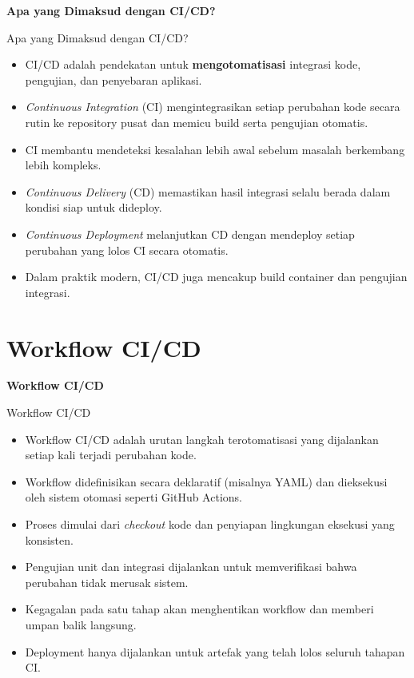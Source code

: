 \documentclass[aspectratio=169, table]{beamer}
\begin{document}
	\begin{frame}{\hfill}
		\centering
		\Huge{\textbf{Apa yang Dimaksud dengan CI/CD?}}
	\end{frame}

\begin{frame}{Apa yang Dimaksud dengan CI/CD?}
	\vspace{6pt}
	\begin{itemize}\small
		\item CI/CD adalah pendekatan untuk \textbf{mengotomatisasi} integrasi kode, pengujian, dan penyebaran aplikasi.
		\item \textit{Continuous Integration} (CI) mengintegrasikan setiap perubahan kode secara rutin ke repository pusat dan memicu build serta pengujian otomatis.
		\item CI membantu mendeteksi kesalahan lebih awal sebelum masalah berkembang lebih kompleks.
		\item \textit{Continuous Delivery} (CD) memastikan hasil integrasi selalu berada dalam kondisi siap untuk dideploy.
		\item \textit{Continuous Deployment} melanjutkan CD dengan mendeploy setiap perubahan yang lolos CI secara otomatis.
		\item Dalam praktik modern, CI/CD juga mencakup build container dan pengujian integrasi.
	\end{itemize}
\end{frame}



\section{Workflow CI/CD}

	\begin{frame}{\hfill}
		\centering
		\Huge{\textbf{Workflow CI/CD}}
	\end{frame}

\begin{frame}{Workflow CI/CD}
	\vspace{6pt}
	\begin{itemize}
		\item Workflow CI/CD adalah urutan langkah terotomatisasi yang dijalankan setiap kali terjadi perubahan kode.
		\item Workflow didefinisikan secara deklaratif (misalnya YAML) dan dieksekusi oleh sistem otomasi seperti GitHub Actions.
		\item Proses dimulai dari \textit{checkout} kode dan penyiapan lingkungan eksekusi yang konsisten.
		\item Pengujian unit dan integrasi dijalankan untuk memverifikasi bahwa perubahan tidak merusak sistem.
		\item Kegagalan pada satu tahap akan menghentikan workflow dan memberi umpan balik langsung.
		\item Deployment hanya dijalankan untuk artefak yang telah lolos seluruh tahapan CI.
	\end{itemize}
\end{frame}
\end{document}

